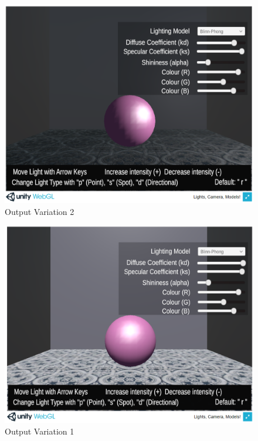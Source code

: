 \documentclass[12pt, titlepage]{article}
\begin{document}
\begin{enumerate}
	\begin{figure}[h]
		\centering
		\includegraphics[scale=0.25]{./images/sphere-lit-point-moveBoundsR}
		\caption{Output Variation 2}
		\label{fig:point-bounds-right}
	\end{figure}	

	\begin{figure}[h]
		\centering
		\includegraphics[scale=0.25]{./images/sphere-lit-direction}
		\caption{Output Variation 1}
		\label{fig:directional-bounds-right}
	\end{figure}


\end{enumerate}
\end{document}
